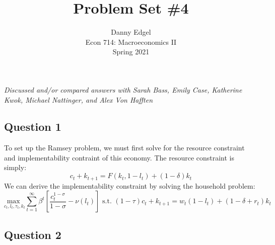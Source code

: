 \documentclass{article}
\newcommand{\usmax}[1]{\underset{#1}{\text{max }}}
\begin{document}
\title{	Problem Set \#4 }
\author{ 	Danny Edgel 					\\ 
			Econ 714: Macroeconomics II		\\
			Spring 2021						\\
		}
\maketitle\thispagestyle{empty}


\noindent\textit{Discussed and/or compared answers with Sarah Bass, Emily Case, Katherine Kwok, Michael Nattinger, and Alex Von Hafften}


\subsection*{Question 1}

To set up the Ramsey problem, we must first solve for the resource constraint and implementability contraint of this economy. The resource constraint is simply:
\[
	c_t + k_{t+1} = F(k_t,1-l_t) +(1-\delta)k_t
\]
We can derive the implementability constraint by solving the household problem:
\[
	\usmax{c_t,l_t,\tau_t,k_t}\sum_{t=1}^\infty \beta^t\left[\frac{c_t^{1-\sigma}}{1-\sigma}-\nu(l_t)\right]\text{ s.t. } 
		(1-\tau)c_t + k_{t+1} = w_t(1-l_t) +(1-\delta + r_t)k_t
\]


\pagebreak
\subsection*{Question 2}
\end{document}
